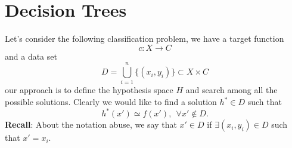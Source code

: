 \documentclass[10pt, letterpaper]{report}
\begin{document}
\chapter{Decision Trees}
Let's consider the following classification problem, we have a target function\begin{equation}
    c:X\rightarrow C
\end{equation}
and a data set \begin{equation}
    D=\bigcup_{i=1}^n\{(x_i,y_i)\}\subset X\times C
\end{equation}
our approach is to define the hypothesis space $H$ and search among all the possible solutions. Clearly we would like to find a solution $h^*\in D$ such that\begin{equation}
    h^*(x')\simeq f(x'), \ \ \forall x'\notin D.
\end{equation}
\textbf{Recall}: About the notation abuse, we say that $x'\in D$ if $\exists (x_i,y_i)\in D $ such that $x'=x_i$.\bigskip 
\end{document}
